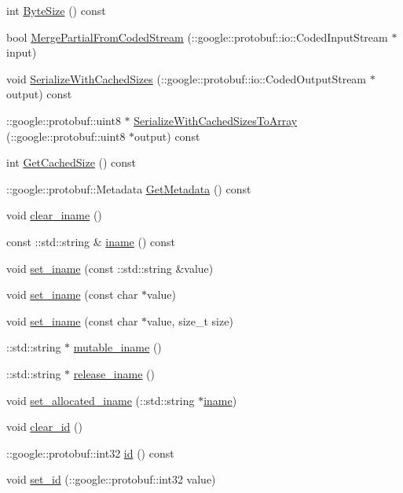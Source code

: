 \begin{DoxyCompactItemize}
\item 
int \hyperlink{classinvest_1_1_investment_a1507e7552d61ba3e8829701b1f6d1375}{Byte\+Size} () const 
\item 
bool \hyperlink{classinvest_1_1_investment_add06896d00fca12107922ecadb39b90d}{Merge\+Partial\+From\+Coded\+Stream} (\+::google\+::protobuf\+::io\+::\+Coded\+Input\+Stream $\ast$input)
\item 
void \hyperlink{classinvest_1_1_investment_a8eae2be4d30fcb6bf1eb561f768f80b9}{Serialize\+With\+Cached\+Sizes} (\+::google\+::protobuf\+::io\+::\+Coded\+Output\+Stream $\ast$output) const 
\item 
\+::google\+::protobuf\+::uint8 $\ast$ \hyperlink{classinvest_1_1_investment_a1e4635b48f2d9dc1a1cb0216b88be8f3}{Serialize\+With\+Cached\+Sizes\+To\+Array} (\+::google\+::protobuf\+::uint8 $\ast$output) const 
\item 
int \hyperlink{classinvest_1_1_investment_a402d604b440380b6345acf6adcff67b5}{Get\+Cached\+Size} () const 
\item 
\+::google\+::protobuf\+::\+Metadata \hyperlink{classinvest_1_1_investment_ae524118399f0301c40b83eb857b1856c}{Get\+Metadata} () const 
\item 
void \hyperlink{classinvest_1_1_investment_aab8ee03eb4f2a12f5b3b6f3a3c31184e}{clear\+\_\+iname} ()
\item 
const \+::std\+::string \& \hyperlink{classinvest_1_1_investment_aa73aacf7b4135b84fa365de007994767}{iname} () const 
\item 
void \hyperlink{classinvest_1_1_investment_ac32822f18bef9dcc417198275a216057}{set\+\_\+iname} (const \+::std\+::string \&value)
\item 
void \hyperlink{classinvest_1_1_investment_a23c5de7d87b26b5c522729711cfc0c57}{set\+\_\+iname} (const char $\ast$value)
\item 
void \hyperlink{classinvest_1_1_investment_a6e76a1eff9dad6353b8508555b2e5225}{set\+\_\+iname} (const char $\ast$value, size\+\_\+t size)
\item 
\+::std\+::string $\ast$ \hyperlink{classinvest_1_1_investment_ac97bfa3c8f49c454fcafd96fcd670345}{mutable\+\_\+iname} ()
\item 
\+::std\+::string $\ast$ \hyperlink{classinvest_1_1_investment_a11810e4e7219d7e55380e52eeb7cc493}{release\+\_\+iname} ()
\item 
void \hyperlink{classinvest_1_1_investment_a6855428f77114c4507758d9b48600818}{set\+\_\+allocated\+\_\+iname} (\+::std\+::string $\ast$\hyperlink{classinvest_1_1_investment_aa73aacf7b4135b84fa365de007994767}{iname})
\item 
void \hyperlink{classinvest_1_1_investment_a30adf5b4cb9ef215a08f4e5e6919691f}{clear\+\_\+id} ()
\item 
\+::google\+::protobuf\+::int32 \hyperlink{classinvest_1_1_investment_aa850dccb62df1ecca2bc10c39143fd21}{id} () const 
\item 
void \hyperlink{classinvest_1_1_investment_a7548755acd240392aa34b7315dd47835}{set\+\_\+id} (\+::google\+::protobuf\+::int32 value)
\end{DoxyCompactItemize}
